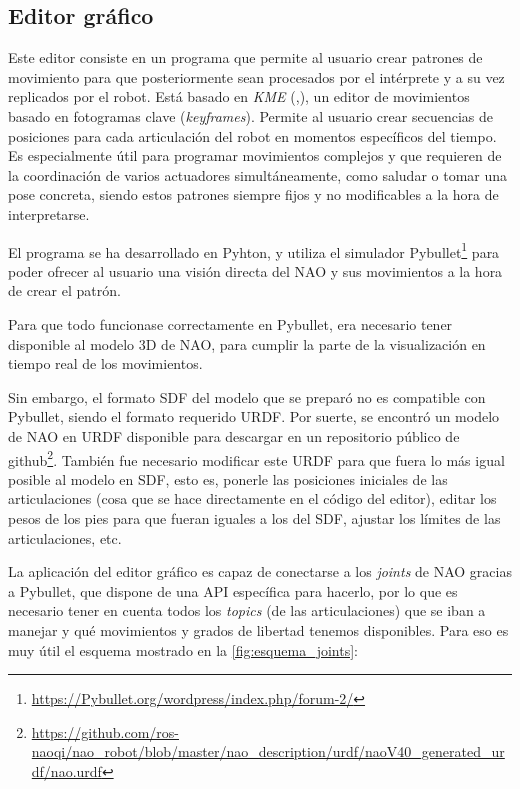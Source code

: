 \subsection{Editor gráfico} \label{subsec:editor}

Este editor consiste en un programa que permite al usuario crear patrones de movimiento para que posteriormente sean procesados por el intérprete y a su vez replicados por el robot. Está basado en \textit{KME} (\cite{paper_1},\cite{paper_2}), un editor de movimientos basado en fotogramas clave (\textit{keyframes}). Permite al usuario crear secuencias de posiciones para cada articulación del robot en momentos específicos del tiempo. Es especialmente útil para programar movimientos complejos y que requieren de la coordinación de varios actuadores simultáneamente, como saludar o tomar una pose concreta, siendo estos patrones siempre fijos y no modificables a la hora de interpretarse.

El programa se ha desarrollado en Pyhton, y utiliza el simulador Pybullet\footnote{\url{https://Pybullet.org/wordpress/index.php/forum-2/}} para poder ofrecer al usuario una visión directa del NAO y sus movimientos a la hora de crear el patrón.

Para que todo funcionase correctamente en Pybullet, era necesario tener disponible al modelo 3D de NAO, para cumplir la parte de la visualización en tiempo real de los movimientos.

Sin embargo, el formato SDF del modelo que se preparó no es compatible con Pybullet, siendo el formato requerido URDF. Por suerte, se encontró un modelo de NAO en URDF disponible para descargar en un repositorio público de github\footnote{\url{https://github.com/ros-naoqi/nao_robot/blob/master/nao_description/urdf/naoV40_generated_urdf/nao.urdf}}. También fue necesario modificar este URDF para que fuera lo más igual posible al modelo en SDF, esto es, ponerle las posiciones iniciales de las articulaciones (cosa que se hace directamente en el código del editor), editar los pesos de los pies para que fueran iguales a los del SDF, ajustar los límites de las articulaciones, etc. 

La aplicación del editor gráfico es capaz de conectarse a los \textit{joints} de NAO gracias a Pybullet, que dispone de una API específica para hacerlo, por lo que es necesario tener en cuenta todos los \textit{topics} (de las articulaciones) que se iban a manejar y qué movimientos y grados de libertad tenemos disponibles. Para eso es muy útil el esquema mostrado en la \autoref{fig:esquema_joints}:

